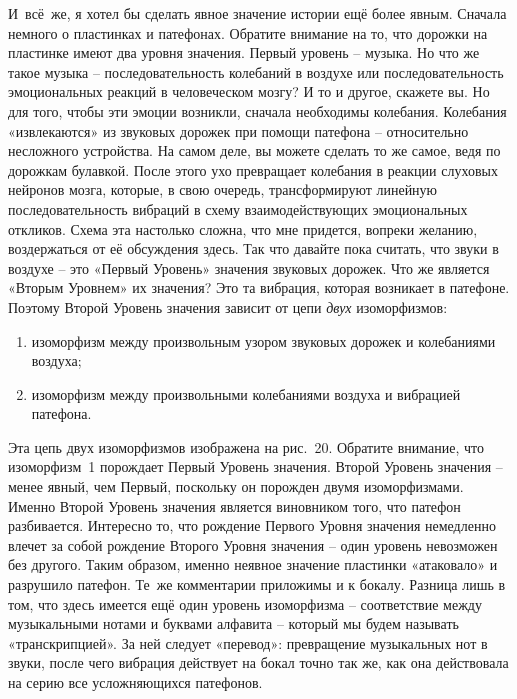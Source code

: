 \documentclass[../main.tex]{subfiles}
\begin{document}
И~всё~же, я хотел бы сделать явное значение истории ещё более явным. Сначала немного о пластинках и патефонах. Обратите внимание на то, что дорожки на пластинке имеют два уровня значения. Первый уровень \--- музыка. Но что же такое музыка \--- последовательность колебаний в воздухе или последовательность эмоциональных реакций в человеческом мозгу? И то и другое, скажете вы. Но для того, чтобы эти эмоции возникли, сначала необходимы колебания. Колебания «извлекаются» из звуковых дорожек при помощи патефона \--- относительно несложного устройства. На самом деле, вы можете сделать то же самое, ведя по дорожкам булавкой. После этого ухо превращает колебания в реакции слуховых нейронов мозга, которые, в свою очередь, трансформируют линейную последовательность вибраций в схему взаимодействующих эмоциональных откликов. Схема эта настолько сложна, что мне придется, вопреки желанию, воздержаться от её обсуждения здесь. Так что давайте пока считать, что звуки в воздухе \--- это «Первый Уровень» значения звуковых дорожек. Что же является «Вторым Уровнем» их значения? Это та вибрация, которая возникает в патефоне. Поэтому Второй Уровень значения зависит от цепи \emph{двух} изоморфизмов:

\begin{enumerate}[label=(\arabic*), noitemsep, topsep=6pt]
    \item изоморфизм между произвольным узором звуковых дорожек и колебаниями воздуха;
    \item изоморфизм между произвольными колебаниями воздуха и вибрацией патефона.
\end{enumerate}

Эта цепь двух изоморфизмов изображена на рис.~20. Обратите внимание, что изоморфизм~1 порождает Первый Уровень значения. Второй Уровень значения \--- менее явный, чем Первый, поскольку он порожден двумя изоморфизмами. Именно Второй Уровень значения является виновником того, что патефон разбивается. Интересно то, что рождение Первого Уровня значения немедленно влечет за собой рождение Второго Уровня значения \--- один уровень невозможен без другого. Таким образом, именно неявное значение пластинки «атаковало» и разрушило патефон. Те~же комментарии приложимы и к бокалу. Разница лишь в том, что здесь имеется ещё один уровень изоморфизма \--- соответствие между музыкальными нотами и буквами алфавита \--- который мы будем называть «транскрипцией». За ней следует «перевод»: превращение музыкальных нот в звуки, после чего вибрация действует на бокал точно так же, как она действовала на серию все усложняющихся патефонов.
\end{document}
